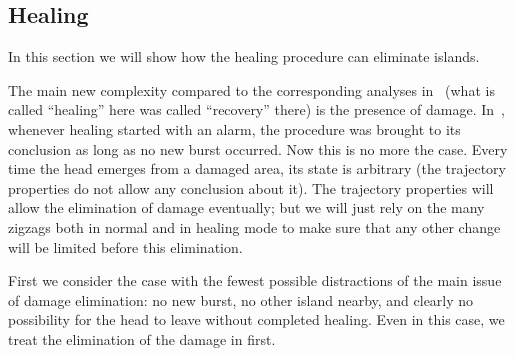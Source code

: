 \documentclass[12pt]{memoir}
\begin{document}
\subsection{Healing}

In this section we will show how the healing procedure can
eliminate islands.

The main new complexity compared to the corresponding analyses in~\cite{burstyTuring13}
(what is called ``healing'' here was called ``recovery'' there)
is the presence of damage.
In~\cite{burstyTuring13}, whenever healing started with an alarm, 
the procedure was brought to its conclusion as long as no new burst occurred.
Now this is no more the case.
Every time the head emerges from a damaged area,
its state is arbitrary (the trajectory properties do not allow any conclusion about it).
The trajectory properties will allow the elimination of damage eventually;
but we will just rely on the many zigzags both in normal and in healing mode to
make sure that any other change will be limited before this elimination.

First we consider the case with the fewest possible distractions of the main
issue of damage elimination: no new burst, no other island nearby,
and clearly no possibility for the head to leave without completed healing.
Even in this case, we treat the elimination of the damage in first.
\end{document}
